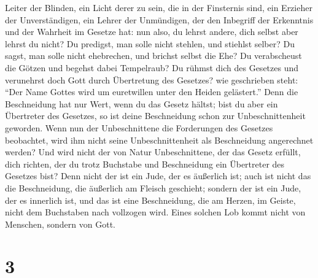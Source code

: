 Leiter der Blinden, ein Licht derer zu sein, die in der Finsternis sind,
 ein Erzieher der Unverständigen, ein Lehrer der
Unmündigen, der den Inbegriff der Erkenntnis und der Wahrheit im Gesetze
hat:  nun also, du lehrst andere, dich selbst aber lehrst
du nicht? Du predigst, man solle nicht stehlen, und stiehlst selber?
 Du sagst, man solle nicht ehebrechen, und brichst selbst
die Ehe? Du verabscheust die Götzen und begehst dabei Tempelraub?
 Du rühmst dich des Gesetzes und verunehrst doch Gott
durch Übertretung des Gesetzes?  wie geschrieben steht:
``Der Name Gottes wird um euretwillen unter den Heiden gelästert.''
 Denn die Beschneidung hat nur Wert, wenn du das Gesetz
hältst; bist du aber ein Übertreter des Gesetzes, so ist deine
Beschneidung schon zur Unbeschnittenheit geworden.  Wenn
nun der Unbeschnittene die Forderungen des Gesetzes beobachtet, wird ihm
nicht seine Unbeschnittenheit als Beschneidung angerechnet werden?
 Und wird nicht der von Natur Unbeschnittene, der das
Gesetz erfüllt, dich richten, der du trotz Buchstabe und Beschneidung
ein Übertreter des Gesetzes bist?  Denn nicht der ist ein
Jude, der es äußerlich ist; auch ist nicht das die Beschneidung, die
äußerlich am Fleisch geschieht;  sondern der ist ein
Jude, der es innerlich ist, und das ist eine Beschneidung, die am
Herzen, im Geiste, nicht dem Buchstaben nach vollzogen wird. Eines
solchen Lob kommt nicht von Menschen, sondern von Gott.

\hypertarget{section-2}{%
\section{3}\label{section-2}}

